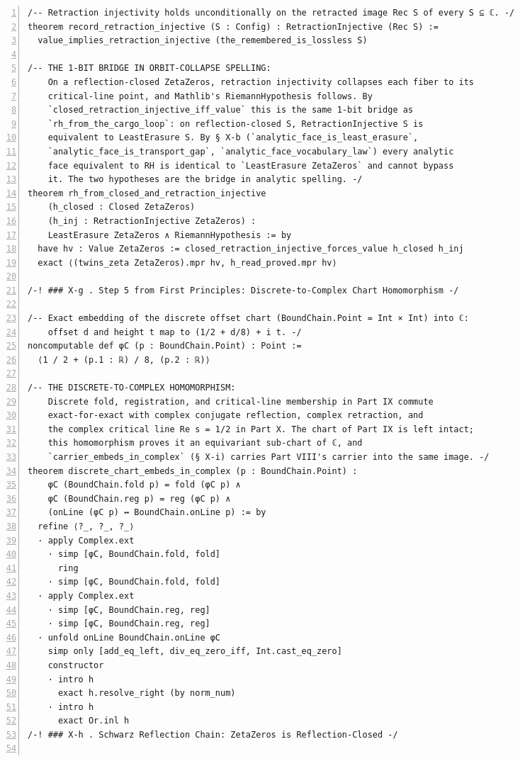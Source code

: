 \documentclass[10pt]{article}
\newcommand{\leansize}{\fontsize{5.5pt}{6.75pt}\selectfont}
\begin{document}
\begin{multicols}{2}
\begin{Verbatim}[numbers=left,firstnumber=1,numbersep=3pt,xleftmargin=2.6em,breaklines=true,breakanywhere=true,breakautoindent=false,breakindent=1.4em,breaksymbolleft={},breakanywheresymbolpre={},fontsize=\leansize]
/-- Retraction injectivity holds unconditionally on the retracted image Rec S of every S ⊆ ℂ. -/
theorem record_retraction_injective (S : Config) : RetractionInjective (Rec S) :=
  value_implies_retraction_injective (the_remembered_is_lossless S)

/-- THE 1-BIT BRIDGE IN ORBIT-COLLAPSE SPELLING:
    On a reflection-closed ZetaZeros, retraction injectivity collapses each fiber to its
    critical-line point, and Mathlib's RiemannHypothesis follows. By
    `closed_retraction_injective_iff_value` this is the same 1-bit bridge as
    `rh_from_the_cargo_loop`: on reflection-closed S, RetractionInjective S is
    equivalent to LeastErasure S. By § X-b (`analytic_face_is_least_erasure`,
    `analytic_face_is_transport_gap`, `analytic_face_vocabulary_law`) every analytic
    face equivalent to RH is identical to `LeastErasure ZetaZeros` and cannot bypass
    it. The two hypotheses are the bridge in analytic spelling. -/
theorem rh_from_closed_and_retraction_injective
    (h_closed : Closed ZetaZeros)
    (h_inj : RetractionInjective ZetaZeros) :
    LeastErasure ZetaZeros ∧ RiemannHypothesis := by
  have hv : Value ZetaZeros := closed_retraction_injective_forces_value h_closed h_inj
  exact ⟨(twins_zeta ZetaZeros).mpr hv, h_read_proved.mpr hv⟩

/-! ### X-g . Step 5 from First Principles: Discrete-to-Complex Chart Homomorphism -/

/-- Exact embedding of the discrete offset chart (BoundChain.Point = Int × Int) into ℂ:
    offset d and height t map to (1/2 + d/8) + i t. -/
noncomputable def φC (p : BoundChain.Point) : Point :=
  ⟨1 / 2 + (p.1 : ℝ) / 8, (p.2 : ℝ)⟩

/-- THE DISCRETE-TO-COMPLEX HOMOMORPHISM:
    Discrete fold, registration, and critical-line membership in Part IX commute
    exact-for-exact with complex conjugate reflection, complex retraction, and
    the complex critical line Re s = 1/2 in Part X. The chart of Part IX is left intact;
    this homomorphism proves it an equivariant sub-chart of ℂ, and
    `carrier_embeds_in_complex` (§ X-i) carries Part VIII's carrier into the same image. -/
theorem discrete_chart_embeds_in_complex (p : BoundChain.Point) :
    φC (BoundChain.fold p) = fold (φC p) ∧
    φC (BoundChain.reg p) = reg (φC p) ∧
    (onLine (φC p) ↔ BoundChain.onLine p) := by
  refine ⟨?_, ?_, ?_⟩
  · apply Complex.ext
    · simp [φC, BoundChain.fold, fold]
      ring
    · simp [φC, BoundChain.fold, fold]
  · apply Complex.ext
    · simp [φC, BoundChain.reg, reg]
    · simp [φC, BoundChain.reg, reg]
  · unfold onLine BoundChain.onLine φC
    simp only [add_eq_left, div_eq_zero_iff, Int.cast_eq_zero]
    constructor
    · intro h
      exact h.resolve_right (by norm_num)
    · intro h
      exact Or.inl h
/-! ### X-h . Schwarz Reflection Chain: ZetaZeros is Reflection-Closed -/


\end{Verbatim}
\end{multicols}
\end{document}
